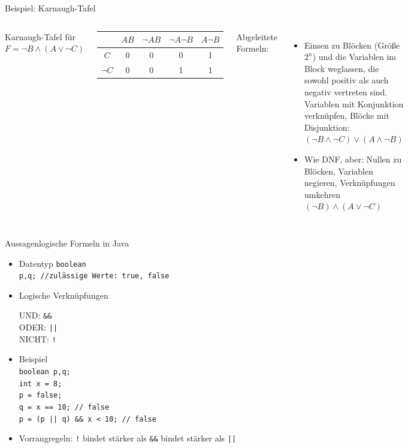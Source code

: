 \begin{frame}{Beispiel: Karnaugh-Tafel}
	\begin{columns}
	Karnaugh-Tafel für $F=\neg B \land (A \lor \neg C)$
	\begin{center}
		\begin{tabular}{|c||c|c|c|c|}
			\hline
			& $AB$ & $\neg A B$ & $\neg A \neg B$ & $A \neg B$ \\
			\hline
			\hline
			$C$ & 0 & 0 & 0 & 1 \\
			\hline
			$\neg C$ & 0 & 0 & 1 & 1 \\
			\hline
		\end{tabular}
	\end{center}
	Abgeleitete Formeln:
	\begin{itemize}
		\item [DNF:] Einsen zu Blöcken (Größe $2^n$) und die Variablen im Block weglassen, die sowohl positiv als auch negativ vertreten sind. Variablen mit Konjunktion verknüpfen, Blöcke mit Disjunktion:\\
		$(\neg B \land \neg C) \lor (A \land \neg B)$
		\item [KNF:] Wie DNF, aber: Nullen zu Blöcken, Variablen negieren, Verknüpfungen umkehren\\
		$(\neg B) \land (A \lor \neg C)$
	\end{itemize}
	\end{columns}
\end{frame}

\begin{frame}{Aussagenlogische Formeln in Java}
	\begin{itemize}
		\item Datentyp \texttt{boolean}\\
		\texttt{p,q; //zulässige Werte: true, false}
		\item Logische Verknüpfungen\\
		\begin{tabbing}
			UND: \quad \= \texttt{\&\&}\\
			ODER: \> \texttt{||}\\
			NICHT: \> \texttt{!}
		\end{tabbing}
		\item Beispiel \\
			\texttt{boolean p,q;}\\
			\texttt{int x = 8;}\\
			\texttt{p = false;}\\
			\texttt{q = x == 10; // false}\\
			\texttt{p = (p || q) \&\& x < 10; //  false}
		\item Vorrangregeln: \texttt{!} bindet stärker als \texttt{\&\&} bindet stärker als \texttt{||}
	\end{itemize}
\end{frame}

